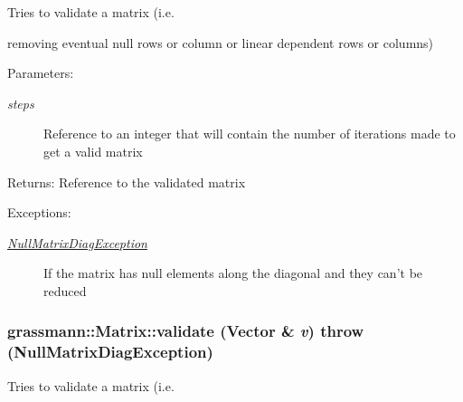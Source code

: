 Tries to validate a matrix (i.e. 

removing eventual null rows or column or linear dependent rows or columns) \begin{Desc}
\item[Parameters:]
\begin{description}
\item[{\em steps}]Reference to an integer that will contain the number of iterations made to get a valid matrix \end{description}
\end{Desc}
\begin{Desc}
\item[Returns:]Reference to the validated matrix \end{Desc}
\begin{Desc}
\item[Exceptions:]
\begin{description}
\item[{\em \hyperlink{classgrassmann_1_1NullMatrixDiagException}{NullMatrixDiagException}}]If the matrix has null elements along the diagonal and they can't be reduced \end{description}
\end{Desc}
\hypertarget{classgrassmann_1_1Matrix_71fb0021c0942ad8f9e0c1bcee78ae61}{
\subsubsection[validate]{ grassmann::Matrix::validate ({\bf Vector} \& {\em v})  throw ({\bf NullMatrixDiagException})}}
\label{classgrassmann_1_1Matrix_71fb0021c0942ad8f9e0c1bcee78ae61}


Tries to validate a matrix (i.e. 


